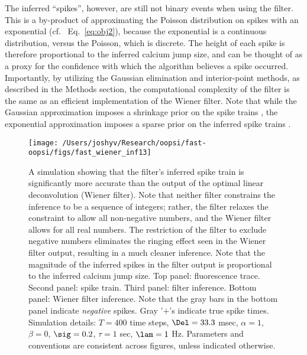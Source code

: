 The inferred ``spikes'', however, are still not binary events when using the \foopsi filter.  This is a by-product of approximating the Poisson distribution on spikes with an exponential (cf.~ Eq.~\eqref{eq:obj2}), because the exponential is a continuous distribution, versus the Poisson, which is discrete.  The height of each spike is therefore proportional to the inferred calcium jump size, and can be thought of as a proxy for the confidence with which the algorithm believes a spike occurred.   Importantly, by utilizing the Gaussian elimination and interior-point methods, as described in the Methods section, the computational complexity of the \foopsi filter is the same as an efficient implementation of the Wiener filter.  Note that while the Gaussian approximation imposes a shrinkage prior on the spike trains \cite{WuGallant06}, the exponential approximation imposes a sparse prior on the inferred spike trains \cite{Seeger08}.  



\begin{figure}[h!]
\centering \texttt{[image: /Users/joshyv/Research/oopsi/fast-oopsi/figs/fast\_wiener\_inf13]}
\caption[\foopsi filter outperforms Wiener filter]{A simulation showing that the \foopsi filter's inferred spike train is significantly more accurate than the output of the optimal linear deconvolution (Wiener filter). Note that neither filter constrains the inference to be a sequence of integers; rather, the \foopsi filter relaxes the constraint to allow all non-negative numbers, and the Wiener filter allows for all real numbers.  The restriction of the \foopsi filter to exclude negative numbers eliminates the ringing effect seen in the Wiener filter output, resulting in a much cleaner inference.  Note that the magnitude of the inferred spikes in the \foopsi filter output is proportional to the inferred calcium jump size.  Top panel: fluorescence trace.  Second panel: spike train.  Third panel: \foopsi filter inference.  Bottom panel: Wiener filter inference.  Note that the gray bars in the bottom panel indicate \emph{negative} spikes. Gray '$+$'s indicate true spike times.  Simulation details: $T= 400$ time steps, $\Del=33.3$ msec, $\alpha=1$, $\beta=0$, $\sig=0.2$, $\tau=1$ sec, $\lam=1$ Hz. Parameters and conventions are consistent across figures, unless indicated otherwise.} \label{fig:woopsi_inf}
\end{figure}


